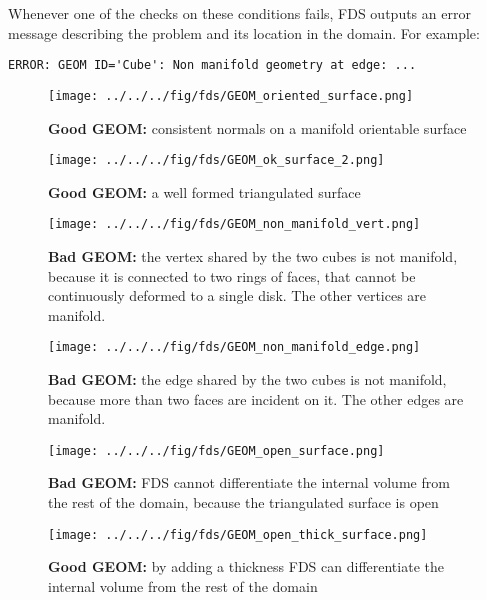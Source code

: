 \documentclass[12pt]{article}
\begin{document}
\pagebreak
Whenever one of the checks on these conditions fails, FDS outputs an error message describing the problem and its location in the domain. For example:\nopagebreak
\begin{verbatim}
ERROR: GEOM ID='Cube': Non manifold geometry at edge: ...
\end{verbatim}

\begin{figure}
	\centering
	\begin{minipage}{.45\textwidth}
		\centering
		\texttt{[image: ../../../fig/fds/GEOM\_oriented\_surface.png]}
		\caption{\textbf{Good {\ct GEOM}:} consistent normals on a manifold orientable surface}
		\label{figure:GEOM_oriented_surface}
	\end{minipage}%
	\hfill
	\begin{minipage}{.45\textwidth}
		\centering
		\texttt{[image: ../../../fig/fds/GEOM\_ok\_surface\_2.png]}
		\caption{\textbf{Good {\ct GEOM}:} a well formed triangulated surface}
		\label{figure:GEOM_ok_surface_2}
	\end{minipage}%
\end{figure}

\begin{figure}
	\centering
	\begin{minipage}{.45\textwidth}
		\centering
		\texttt{[image: ../../../fig/fds/GEOM\_non\_manifold\_vert.png]}
		\caption{\textbf{Bad {\ct GEOM}:} the vertex shared by the two cubes is not manifold, because it is connected to two rings of faces, that cannot be continuously deformed to a single disk. The other vertices are manifold.}
		\label{figure:GEOM_non_manifold_vert}
	\end{minipage}%
	\hfill
	\begin{minipage}{.45\textwidth}
		\centering
		\texttt{[image: ../../../fig/fds/GEOM\_non\_manifold\_edge.png]}
		\caption{\textbf{Bad {\ct GEOM}:} the edge shared by the two cubes is not manifold, because more than two faces are incident on it. The other edges are manifold.\newline}
		\label{figure:GEOM_non_manifold_edge}
	\end{minipage}%
\end{figure}

\begin{figure}
	\centering
	\begin{minipage}{.45\textwidth}
		\centering
		\texttt{[image: ../../../fig/fds/GEOM\_open\_surface.png]}
		\caption{\textbf{Bad {\ct GEOM}:} FDS cannot differentiate the internal volume from the rest of the domain, because the triangulated surface is open}
		\label{figure:GEOM_open_surface}
	\end{minipage}%
	\hfill
	\begin{minipage}{.45\textwidth}
		\centering
		\texttt{[image: ../../../fig/fds/GEOM\_open\_thick\_surface.png]}
		\caption{\textbf{Good {\ct GEOM}:} by adding a thickness FDS can differentiate the internal volume from the rest of the domain\newline}
		\label{figure:GEOM_open_thick_surface}
\end{minipage}%
\end{figure}
\end{document}
